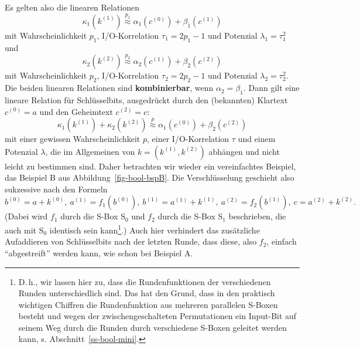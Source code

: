 \begin{refsegment}
Es gelten also die linearen Relationen
\[
   \kappa_1(k^{(1)}) \stackrel{p_1}{\approx} \alpha_1(c^{(0)}) + \beta_1(c^{(1)})
\]
mit Wahrscheinlichkeit $p_1$, I/O-Korrelation $\tau_1 = 2p_1 - 1$ und
Potenzial $\lambda_1 = \tau_1^2$ und
\[
   \kappa_2(k^{(2)}) \stackrel{p_2}{\approx} \alpha_2(c^{(1)}) + \beta_2(c^{(2)})
\]
mit Wahrscheinlichkeit $p_2$, I/O-Korrelation $\tau_2 = 2p_2 - 1$ und
Potenzial $\lambda_2 = \tau_2^2$.
Die beiden linearen Relationen sind {\bf kombinierbar}, wenn $\alpha_2 = \beta_1$.
Dann gilt eine lineare Relation für Schlüsselbits, ausgedrückt durch
den (bekannten) Klartext $c^{(0)} = a$ und den Geheimtext $c^{(2)} = c$:
\[
   \kappa_1(k^{(1)}) + \kappa_2(k^{(2)}) \stackrel{p}{\approx}
      \alpha_1(c^{(0)}) + \beta_2(c^{(2)})
\]
mit einer gewissen Wahrscheinlichkeit $p$, einer I/O-Korrelation
$\tau$ und einem Potenzial $\lambda$,
die im Allgemeinen von $k = (k^{(1)},k^{(2)})$ abhängen und nicht leicht zu
bestimmen sind. Daher betrachten wir wieder
ein vereinfachtes Beispiel, das Beispiel B aus Abbildung~\ref{fig-bool-bspB}.
Die Verschlüsselung geschieht also sukzessive nach den Formeln
\[
   b^{(0)} = a+k^{(0)},\: a^{(1)} = f_1(b^{(0)}),\: b^{(1)} = a^{(1)}+k^{(1)},\:
   a^{(2)} = f_2(b^{(1)}),\: c = a^{(2)}+k^{(2)}.
\]
(Dabei wird $f_1$ durch die S-Box $\mathrm{S}_0$ und $f_2$ durch die S-Box
$\mathrm{S}_1$ beschrieben, die auch mit $\mathrm{S}_0$ identisch sein
kann\footnote{%
   D.\,h., wir lassen hier zu, dass die Rundenfunktionen der verschiedenen
   Runden unterschiedlich sind. Das hat den Grund, dass in den praktisch
   wichtigen Chiffren die Rundenfunktion aus mehreren parallelen S-Boxen
   besteht und wegen der zwischengeschalteten Permutationen ein Input-Bit
   auf seinem Weg durch die Runden durch verschiedene S-Boxen geleitet
   werden kann, s. Abschnitt~\ref{ss-bool-mini}.
}.) Auch hier verhindert das zusätzliche Aufaddieren
von Schlüsselbits nach der letzten Runde, dass diese, also $f_2$, einfach
"`abgestreift"' werden kann, wie schon bei Beispiel A.


\end{refsegment}
